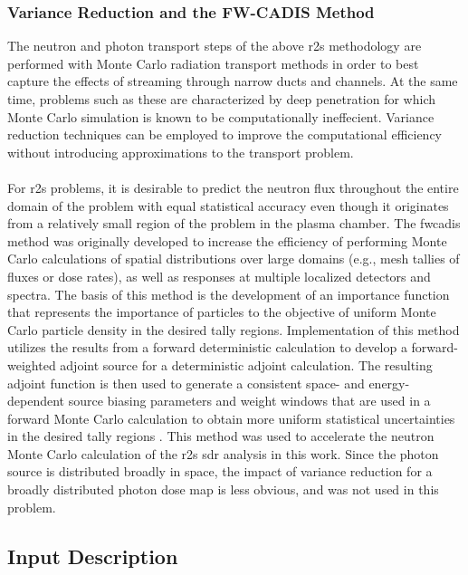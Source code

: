 \documentclass[12pt]{article}
\begin{document}
\subsubsection{Variance Reduction and the FW-CADIS Method}
The neutron and photon transport steps of the above \gls{r2s} methodology are
performed with Monte Carlo radiation transport methods in order to best
capture the effects of streaming through narrow ducts and channels.  At the
same time, problems such as these are characterized by deep penetration for
which Monte Carlo simulation is known to be computationally ineffecient.
Variance reduction techniques can be employed to improve the computational
efficiency without introducing approximations to the transport problem.
\\
\\
For \gls{r2s} problems, it is desirable to predict the neutron flux throughout
the entire domain of the problem with equal statistical accuracy even though
it originates from a relatively small region of the problem in the plasma
chamber.  The \gls{fwcadis} method was originally developed to increase the
efficiency of performing Monte Carlo calculations of spatial distributions
over large domains (e.g., mesh tallies of fluxes or dose rates), as well as
responses at multiple localized detectors and spectra. The basis of this
method is the development of an importance function that represents the
importance of particles to the objective of uniform Monte Carlo particle
density in the desired tally regions.  Implementation of this method utilizes
the results from a forward deterministic calculation to develop a
forward-weighted adjoint source for a deterministic adjoint calculation. The
resulting adjoint function is then used to generate a consistent space- and
energy-dependent source biasing parameters and weight windows that are used in
a forward Monte Carlo calculation to obtain more uniform statistical
uncertainties in the desired tally regions \cite{wagnerNSEFWCADIS}. This
method was used to accelerate the neutron Monte Carlo calculation of
the \gls{r2s} \gls{sdr} analysis in this work.  Since the photon source is
distributed broadly in space, the impact of variance reduction for a broadly
distributed photon dose map is less obvious, and was not used in this problem.


\subsection{Input Description}
\end{document}
